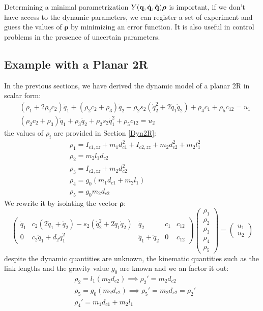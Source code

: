 \documentclass[10pt, a4paper]{report}
\newcommand{\q}{{\mathbf q}}
\begin{document}
Determining a minimal parametrization $ Y(\q,\dq,\ddq)\boldsymbol{\rho}$ is important, if we don't have access to the dynamic parameters, we can register a set of experiment and guess the values of $\boldsymbol{\rho}$ by minimizing an error function. It is also useful in control problems in the presence of uncertain parameters.
\subsection{Example with a Planar 2R}
In the previous sections, we have derived the dynamic model of a planar 2R in scalar form:\begin{align}
&(\rho_1 + 2\rho_2 c_2)\ddot{q}_1 + (\rho_2 c_2 + \rho_3)\ddot{q}_2 - \rho_2 s_2(\dot{q}_2^2 + 2\dot{q}_1 \dot{q}_2)
+ \rho_4 c_1 + \rho_5 c_{12} = u_1 \\
&(\rho_2 c_2 + \rho_3)\ddot{q}_1 + \rho_3 \ddot{q}_2 + \rho_2 s_2 \dot{q}_1^2 + \rho_5 c_{12} = u_2
\end{align}
the values of $\rho_i$ are provided in Section \ref{Dyn2R}:
\begin{align}
    &\rho_1=I_{c1,zz} + m_1 d_{c1}^2 + I_{c2,zz} + m_2 d_{c2}^2 + m_2 l_1^2\\ 
   &\rho_2=m_2l_1d_{c2}
    \\ &\rho_3=I_{c2,zz} + m_2 d_{c2}^2
    \\ &\rho_4=g_0(m_1d_{c1}+m_2l_1)
    \\ &\rho_5=g_0m_2d_{c2}
\end{align}
We rewrite it by isolating the vector $\boldsymbol{\rho}$:\begin{equation}
    \begin{pmatrix}
        \ddot q_1&c_2(2\ddot q_1+\ddot q_2)-s_2(\dot q_2^2+2\dot q_1\dot q_2)&\ddot q_2&c_1&c_{12}\\
        0&c_2\ddot q_1+d_2\dot q_1^2 & \ddot q_1+\ddot q_2&0&c_{12}
    \end{pmatrix}\begin{pmatrix}
        \rho_1\\\rho_2\\\rho_3\\\rho_4\\\rho_5
    \end{pmatrix}=\begin{pmatrix}
        u_1\\u_2
    \end{pmatrix}
\end{equation}
despite the dynamic quantities are unknown, the kinematic quantities such as the link lengths and the gravity value $g_0$ are known and we an factor it out:\begin{align}
    &\rho_2=l_1(m_2d_{c2})\implies \rho_2'=m_2d_{c2}\\ 
    &\rho_5=g_0(m_2d_{c2})\implies \rho_5'=m_2d_{c2}=\rho_2'\\
    &\rho_4'=m_1d_{c1}+m_2l_1
\end{align} 
\end{document}
